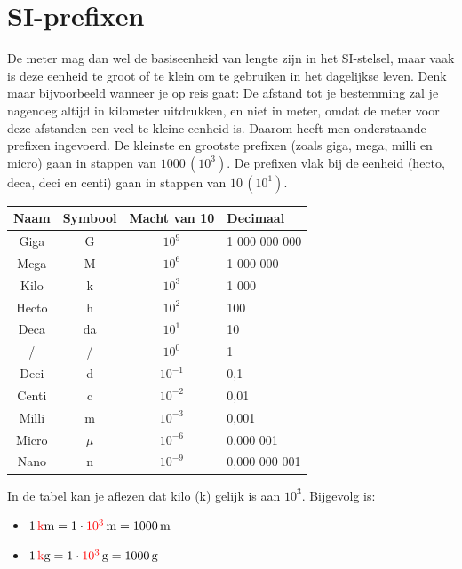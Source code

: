 \documentclass{ximera}
\begin{document}
\section{SI-prefixen}
De meter mag dan wel de basiseenheid van lengte zijn in het SI-stelsel, maar vaak is deze eenheid te groot of te klein om te gebruiken in het dagelijkse leven. Denk maar bijvoorbeeld wanneer je op reis gaat: De afstand tot je bestemming zal je nagenoeg altijd in kilometer uitdrukken, en niet in meter, omdat de meter voor deze afstanden een veel te kleine eenheid is. Daarom heeft men onderstaande prefixen ingevoerd. De kleinste en grootste prefixen (zoals giga, mega, milli en micro) gaan in stappen van $1000 \, (10^{3})$. De prefixen vlak bij de eenheid (hecto, deca, deci en centi) gaan in stappen van $10 \, (10^{1})$.

\begin{center}
    \begin{tabular}{ |c|c|c|l| } 
    \hline
    \textbf{Naam} & \textbf{Symbool} & \textbf{Macht van 10} & \textbf{Decimaal} \\
    \hline
    Giga & G & $10^{9}$ & 1 000 000 000 \\
    \hline
    Mega & M & $10^{6}$ & 1 000 000 \\
    \hline
    Kilo & k & $10^{3}$ & 1 000 \\
    \hline
    Hecto & h & $10^{2}$ & 100 \\
    \hline
    Deca & da & $10^{1}$ & 10 \\
    \hline
    / & / & $10^{0}$ & 1 \\
    \hline
    Deci & d & $10^{-1}$ & 0,1 \\
    \hline
    Centi & c & $10^{-2}$ & 0,01 \\
    \hline
    Milli & m & $10^{-3}$ & 0,001 \\
    \hline
    Micro & $\mu$ & $10^{-6}$ & 0,000 001 \\
    \hline
    Nano & n & $10^{-9}$ & 0,000 000 001 \\
    \hline
    \end{tabular}
\end{center}

\begin{example}[title={Rekenen met Prefixen}]\nl
    In de tabel kan je aflezen dat kilo (k) gelijk is aan $10^{3}$. Bijgevolg is:
    \begin{itemize}
    \item $1 \, \textcolor{red}{\mathrm{k}}\mathrm{m} = 1 \cdot \textcolor{red}{10^{3}} \, \mathrm{m} = 1000 \, \mathrm{m}$
    \item $1 \, \textcolor{red}{\mathrm{k}}\mathrm{g} = 1 \cdot \textcolor{red}{10^{3}} \, \mathrm{g} = 1000 \, \mathrm{g}$
    \end{itemize}
\end{example}
\end{document}
